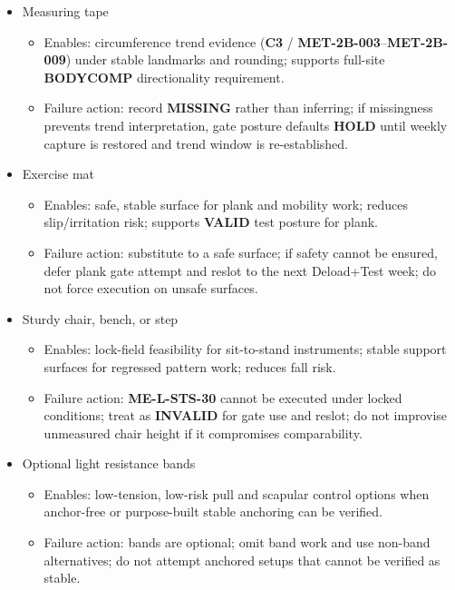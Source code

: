 \documentclass[10pt]{article}
\begin{document}
\begin{itemize}
\item Measuring tape
  \begin{itemize}
  \item Enables: circumference trend evidence (\textbf{C3} / \textbf{MET-2B-003}–\textbf{MET-2B-009}) under stable landmarks and rounding; supports full-site \textbf{BODYCOMP} directionality requirement.
  \item Failure action: record \textbf{MISSING} rather than inferring; if missingness prevents trend interpretation, gate posture defaults \textbf{HOLD} until weekly capture is restored and trend window is re-established.
  \end{itemize}

\item Exercise mat
  \begin{itemize}
  \item Enables: safe, stable surface for plank and mobility work; reduces slip/irritation risk; supports \textbf{VALID} test posture for plank.
  \item Failure action: substitute to a safe surface; if safety cannot be ensured, defer plank gate attempt and reslot to the next Deload+Test week; do not force execution on unsafe surfaces.
  \end{itemize}

\item Sturdy chair, bench, or step
  \begin{itemize}
  \item Enables: lock-field feasibility for sit-to-stand instruments; stable support surfaces for regressed pattern work; reduces fall risk.
  \item Failure action: \textbf{ME-L-STS-30} cannot be executed under locked conditions; treat as \textbf{INVALID} for gate use and reslot; do not improvise unmeasured chair height if it compromises comparability.
  \end{itemize}

\item Optional light resistance bands
  \begin{itemize}
  \item Enables: low-tension, low-risk pull and scapular control options when anchor-free or purpose-built stable anchoring can be verified.
  \item Failure action: bands are optional; omit band work and use non-band alternatives; do not attempt anchored setups that cannot be verified as stable.
  \end{itemize}


\end{itemize}
\end{document}
